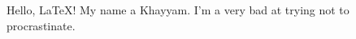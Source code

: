 \documentclass{article}
\begin{document}
    Hello, \LaTeX!
    My name a Khayyam.  I'm a very bad at trying not to procrastinate.
\end{document}
